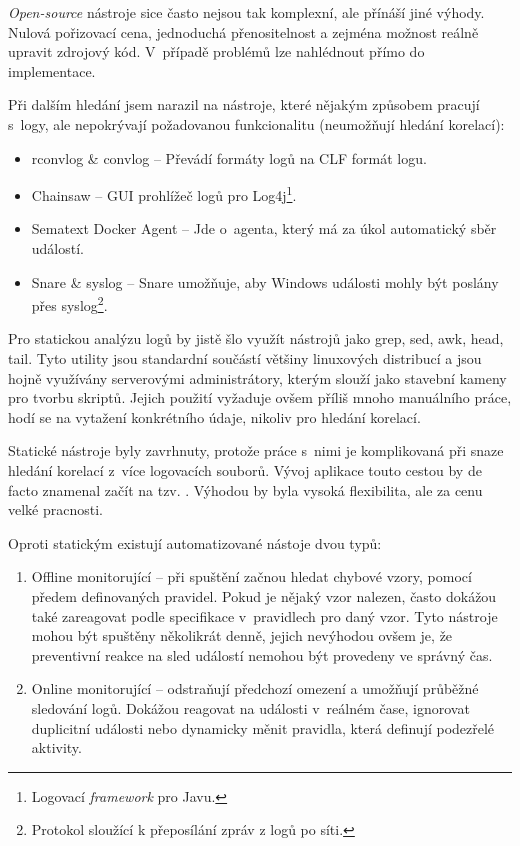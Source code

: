 \documentclass[thesis=B,czech]{FITthesis}[2012/06/26]
\begin{document}
\textit{Open-source} nástroje sice často nejsou tak komplexní, ale přínáší jiné výhody. Nulová pořizovací cena, jednoduchá přenositelnost a zejména možnost reálně upravit zdrojový kód. V~případě problémů lze nahlédnout přímo do implementace. \cite{forensicWithOpenSource}

Při dalším hledání jsem narazil na nástroje, které nějakým způsobem pracují s~logy, ale nepokrývají požadovanou funkcionalitu (neumožňují hledání korelací):
\begin{itemize}
	\item{rconvlog \& convlog -- Převádí formáty logů na CLF formát logu. \cite{rConvlog}}
	\item{Chainsaw -- GUI prohlížeč logů pro Log4j\footnote{Logovací \textit{framework} pro Javu.}. \cite{chainsaw}}
	\item{Sematext Docker Agent -- Jde o~agenta, který má za úkol automatický sběr událostí. \cite{docker}}
	\item{Snare \& syslog -- Snare umožňuje, aby Windows události mohly být poslány přes syslog\footnote{Protokol sloužící k přeposílání zpráv z logů po síti.}. \cite{logManagement}}
\end{itemize}

Pro statickou analýzu logů by jistě šlo využít nástrojů jako grep, sed, awk, head, tail. Tyto utility jsou standardní součástí většiny linuxových distribucí a jsou hojně využívány serverovými administrátory, kterým slouží jako stavební kameny pro tvorbu skriptů. Jejich použití vyžaduje ovšem příliš mnoho manuálního práce, hodí se na vytažení konkrétního údaje, nikoliv pro hledání korelací. \cite{logManagement}

Statické nástroje byly zavrhnuty, protože práce s~nimi je komplikovaná při snaze hledání korelací z~více logovacích souborů. Vývoj aplikace touto cestou by de facto znamenal začít na tzv. . Výhodou by byla vysoká flexibilita, ale za cenu velké pracnosti.

Oproti statickým existují automatizované nástoje dvou typů: \cite{insiderThreatDetection}
\begin{enumerate}
	\item Offline monitorující -- při spuštění začnou hledat chybové vzory, pomocí předem definovaných pravidel. Pokud je nějaký vzor nalezen, často dokážou také zareagovat podle specifikace v~pravidlech pro daný vzor. Tyto nástroje mohou být spuštěny několikrát denně, jejich nevýhodou ovšem je, že preventivní reakce na sled událostí nemohou být provedeny ve správný čas. 
	\item Online monitorující -- odstraňují předchozí omezení a umožňují průběžné sledování logů. Dokážou reagovat na události v~reálném čase, ignorovat duplicitní události nebo dynamicky měnit pravidla, která definují podezřelé aktivity.
\end{enumerate} 
\end{document}
